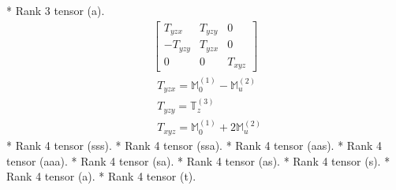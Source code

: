 \documentclass[fleqn,8pt,landscape]{jsarticle}
\begin{document}
* Rank 3 tensor (a).
\begin{align*}
\begin{bmatrix} T_{yzx} & T_{yzy} & 0 \\ - T_{yzy} & T_{yzx} & 0 \\ 0 & 0 & T_{xyz} \end{bmatrix}
\end{align*}
\begin{align*}
& T_{yzx} = \mathbb{M}_{0}^{(1)} - \mathbb{M}_{u}^{(2)} \\
& T_{yzy} = \mathbb{T}_{z}^{(3)} \\
& T_{xyz} = \mathbb{M}_{0}^{(1)} + 2 \mathbb{M}_{u}^{(2)}
\end{align*}
* Rank 4 tensor (sss).
* Rank 4 tensor (ssa).
* Rank 4 tensor (aas).
* Rank 4 tensor (aaa).
* Rank 4 tensor (sa).
* Rank 4 tensor (as).
* Rank 4 tensor (s).
* Rank 4 tensor (a).
* Rank 4 tensor (t).
\end{document}
